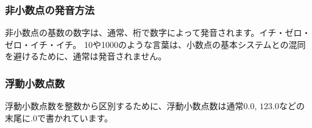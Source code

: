 \subsubsection{非小数点の発音方法}

非小数点の基数の数字は、通常、桁で数字によって発音されます。イチ・ゼロ・ゼロ・イチ・イチ。 10や1000のような言葉は、小数点の基本システムとの混同を避けるために、通常は発音されません。

\subsubsection{浮動小数点数}

浮動小数点数を整数から区別するために、浮動小数点数は通常$0.0$, $123.0$などの末尾に.0で書かれています。

